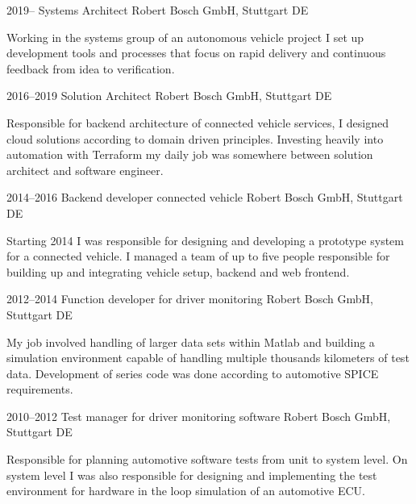 \documentclass[]{friggeri-cv} %
\begin{document}
\begin{entrylist}
\entry
{2019--}
{Systems Architect}
{Robert Bosch GmbH, Stuttgart DE}
{Working in the systems group of an autonomous vehicle project I set up development tools and processes that focus on rapid delivery and continuous feedback from idea to verification.

}
\end{entrylist}

\begin{entrylist}
\entry
{2016--2019}
{Solution Architect}
{Robert Bosch GmbH, Stuttgart DE}
{Responsible for backend architecture of connected vehicle services, I designed cloud solutions according to domain driven principles. Investing heavily into automation with Terraform my daily job was somewhere between solution architect and software engineer.

}
\end{entrylist}
\begin{entrylist}
\entry
{2014--2016}
{Backend developer connected vehicle}
{Robert Bosch GmbH, Stuttgart DE}
{Starting 2014 I was responsible for designing and developing a prototype system for a connected vehicle. I managed a team of up to five people responsible for building up and integrating vehicle setup, backend and web frontend.

}
\end{entrylist}
\begin{entrylist}
\entry
{2012--2014}
{Function developer for driver monitoring}
{Robert Bosch GmbH, Stuttgart DE}
{My job involved handling of larger data sets within Matlab and building a simulation environment capable of handling multiple thousands kilometers of test data. Development of series code was done according to automotive SPICE requirements.

}
\end{entrylist}
\begin{entrylist}
\entry
{2010--2012}
{Test manager for driver monitoring software}
{Robert Bosch GmbH, Stuttgart DE}
{Responsible for planning automotive software tests from unit to system level. On system level I was also responsible for designing and implementing the test environment for hardware in the loop simulation of an automotive ECU.

}
\end{entrylist}
\end{document}
